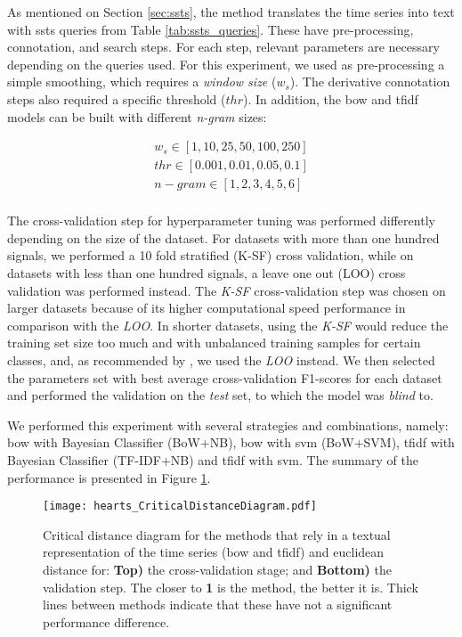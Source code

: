 As mentioned on Section \ref{sec:ssts}, the method translates the time series into text with \gls{ssts} queries from Table \ref{tab:ssts_queries}. These have pre-processing, connotation, and search steps. For each step, relevant parameters are necessary depending on the queries used. For this experiment, we used as pre-processing a simple smoothing, which requires a \textit{window size} ($w_s$). The derivative connotation steps also required a specific threshold ($thr$). In addition, the \gls{bow} and \gls{tfidf} models can be built with different \textit{n-gram} sizes:

\begin{equation}
\begin{gathered}
w_s \in [1, 10, 25, 50, 100, 250]\\
thr \in [0.001, 0.01, 0.05, 0.1]\\
n-gram \in [1, 2, 3, 4, 5, 6]\\
\end{gathered}
\end{equation}

The cross-validation step for hyperparameter tuning was performed differently depending on the size of the dataset. For datasets with more than one hundred signals, we performed a 10 fold stratified (K-SF) cross validation, while on datasets with less than one hundred signals, a leave one out (LOO) cross validation was performed instead. The \textit{K-SF} cross-validation step was chosen on larger datasets because of its higher computational speed performance in comparison with the \textit{LOO}. In shorter datasets, using the \textit{K-SF} would reduce the training set size too much and with unbalanced training samples for certain classes, and, as recommended by \cite{ucr}, we used the \textit{LOO} instead. We then selected the parameters set with best average cross-validation F1-scores for each dataset and performed the validation on the \textit{test} set, to which the model was \textit{blind} to.

We performed this experiment with several strategies and combinations, namely: \gls{bow} with Bayesian Classifier (BoW+NB), \gls{bow} with \gls{svm} (BoW+SVM), \gls{tfidf} with Bayesian Classifier (TF-IDF+NB) and \gls{tfidf} with \gls{svm}. The summary of the performance is presented in Figure \ref{fig:critical_distances}.

\begin{figure}
    \centering
    \texttt{[image: hearts\_CriticalDistanceDiagram.pdf]}
    \caption{Critical distance diagram for the methods that rely in a textual representation of the time series (\gls{bow} and \gls{tfidf}) and euclidean distance for: \textbf{Top)} the cross-validation stage; and \textbf{Bottom)} the validation step. The closer to \textbf{1} is the method, the better it is. Thick lines between methods indicate that these have not a significant performance difference.}
    \label{fig:critical_distances}
\end{figure}

